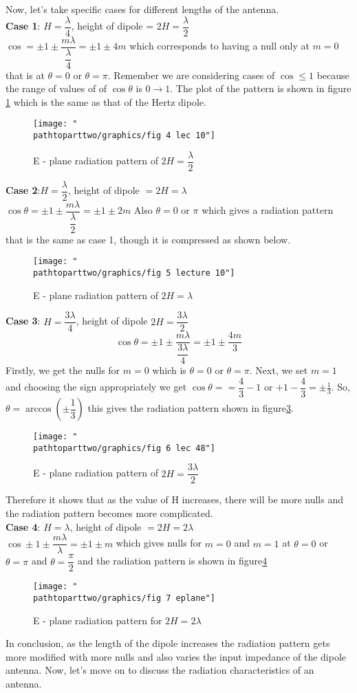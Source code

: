 Now, let's take specific cases for different lengths of the antenna.\\
\textbf{Case 1}: $H =\dfrac{\lambda}{4}$, height of dipole = $2H = \dfrac{\lambda}{2}$\\
$\cos = \pm1 \pm \dfrac{m\lambda}{\dfrac{\lambda}{4}} = \pm1 \pm 4m$ which corresponds to having a null only at $m = 0$ that is at $\theta = 0$ or $\theta = \pi$. Remember we are considering cases of $\cos\leq1$ because the range of values of of $\cos \theta$ is $0\rightarrow1$. The plot of the  pattern is shown in figure \ref{figure4} which is the same as that of the Hertz dipole.
\begin{figure}[h]
\centering
\texttt{[image: "\\pathtoparttwo/graphics/fig 4 lec 10"]}
\caption{E - plane radiation pattern of $2H = \dfrac{\lambda}{2}$}
\label{figure4}
\end{figure}

\textbf{Case 2}:$H = \dfrac{\lambda}{2}$, height of dipole $=2H =\lambda$\\
$\cos \theta = \pm 1 \pm \dfrac{m\lambda}{\dfrac{\lambda}{2}} = \pm 1 \pm 2m$
Also $\theta = 0$ or $\pi$ which gives a radiation pattern that is the same as case 1, though it is compressed as shown below. 
\begin{figure}[h]
\centering
\texttt{[image: "\\pathtoparttwo/graphics/fig 5 lecture 10"]}
\caption{E - plane radiation pattern of $2H = \lambda$}
\label{figure5}
\end{figure}

\textbf{Case 3}: $H = \dfrac{3\lambda}{4}$, height of dipole $2H = \dfrac{3\lambda}{2}$\\
$$\cos \theta = \pm1 \pm \dfrac{m\lambda}{\dfrac{3\lambda}{4}} = \pm 1\pm \dfrac{4m}{3}$$
Firstly, we get the nulls for $m=0$ which is $\theta = 0$ or $\theta = \pi$. Next, we set $m=1$ and choosing the sign appropriately we get $\cos \theta = =\dfrac{4}{3} - 1$ or $+1-\dfrac{4}{3}=\pm\frac{1}{3}$. So, $\theta = \arccos(\pm \dfrac{1}{3})$
this gives the radiation pattern shown in figure\ref{figure6}.
\begin{figure}[h]
\centering
\texttt{[image: "\\pathtoparttwo/graphics/fig 6 lec 48"]}
\caption{E - plane radiation pattern of $2H = \dfrac{3\lambda}{2}$}
\label{figure6}
\end{figure}

Therefore it shows that as the value of H increases, there will be more nulls and the radiation pattern becomes more complicated.\\
\textbf{Case 4}: $H = \lambda$, height of dipole $ =2H = 2\lambda$\\
$\cos \pm 1 \pm \dfrac{m\lambda}{\lambda} = \pm1 \pm m$ which gives nulls for $m = 0$ and $m= 1$ at $\theta =0$ or $\theta = \pi$ and $\theta = \dfrac{\pi}{2}$ and the radiation pattern is shown in figure\ref{figure7}
\begin{figure}[h]
\centering
\texttt{[image: "\\pathtoparttwo/graphics/fig 7 eplane"]}
\caption{E - plane radiation pattern for $2H = 2\lambda$}
\label{figure7}
\end{figure}

In conclusion, as the length of the dipole increases the radiation pattern gets more modified with more nulls and also varies the input impedance of the dipole antenna. Now, let's move on to discuss the radiation characteristics of an antenna.
